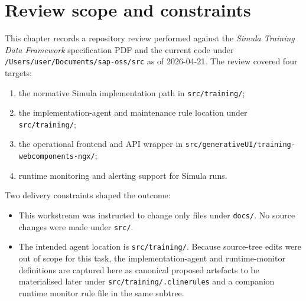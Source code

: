 \documentclass[12pt,a4paper,twoside]{report}
\begin{document}
\section{Review scope and constraints}
This chapter records a repository review performed against the
\emph{Simula Training Data Framework} specification PDF and the
current code under \texttt{/Users/user/Documents/sap-oss/src} as of
2026-04-21. The review covered four targets:
\begin{enumerate}[label=\arabic*.]
\item the normative Simula implementation path in
\texttt{src/training/};
\item the implementation-agent and maintenance rule location under
\texttt{src/training/};
\item the operational frontend and API wrapper in
\texttt{src/generativeUI/training-webcomponents-ngx/};
\item runtime monitoring and alerting support for Simula runs.
\end{enumerate}

Two delivery constraints shaped the outcome:
\begin{itemize}
\item This workstream was instructed to change only files under
\texttt{docs/}. No source changes were made under
\texttt{src/}.
\item The intended agent location is \texttt{src/training/}. Because
source-tree edits were out of scope for this task, the
implementation-agent and runtime-monitor definitions are captured
here as canonical proposed artefacts to be materialised later
under \texttt{src/training/.clinerules} and a companion runtime
monitor rule file in the same subtree.
\end{itemize}
\end{document}
